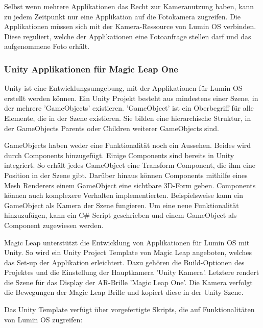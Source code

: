 Selbst wenn mehrere Applikationen das Recht zur Kameranutzung haben, kann zu jedem Zeitpunkt nur eine Applikation auf die Fotokamera zugreifen. Die Applikationen müssen sich mit der Kamera-Ressource von Lumin OS verbinden. Diese reguliert, welche der Applikationen eine Fotoanfrage stellen darf und das aufgenommene Foto erhält. 


\subsubsection{Unity Applikationen für Magic Leap One}
Unity ist eine Entwicklungsumgebung, mit der Applikationen für Lumin OS erstellt werden können. Ein Unity Projekt besteht aus mindestens einer Szene, in der mehrere 'GameObjects' existieren. 'GameObject' ist ein Oberbegriff für alle Elemente, die in der Szene existieren. Sie bilden eine hierarchische Struktur, in der GameObjects Parents oder Children weiterer GameObjects sind.\citep{unitygameobject}

GameObjects haben weder eine Funktionalität noch ein Aussehen. Beides wird durch Components hinzugefügt. Einige Components sind bereits in Unity integriert. So erhält jedes GameObject eine Transform Component, die ihm eine Position in der Szene gibt. Darüber hinaus können Components mithilfe eines Mesh Renderers einem GameObject eine sichtbare 3D-Form geben. Components können auch komplexere Verhalten implementierten. Beispielsweise kann ein GameObject als Kamera der Szene fungieren. Um eine neue Funktionalität hinzuzufügen, kann ein C\# Script geschrieben und einem GameObject als Component zugewiesen werden.

Magic Leap unterstützt die Entwicklung von Applikationen für Lumin OS mit Unity. So wird ein Unity Project Template von Magic Leap angeboten, welches das Set-up der Applikation erleichtert. Dazu gehören die Build-Optionen des Projektes und die Einstellung der Hauptkamera 'Unity Kamera'. Letztere rendert die Szene für das Display der AR-Brille 'Magic Leap One'. Die Kamera verfolgt die Bewegungen der Magic Leap Brille und kopiert diese in der Unity Szene. \citep{mlgetstarted}%

Das Unity Template verfügt über vorgefertigte Skripts, die auf Funktionalitäten von Lumin OS zugreifen:

